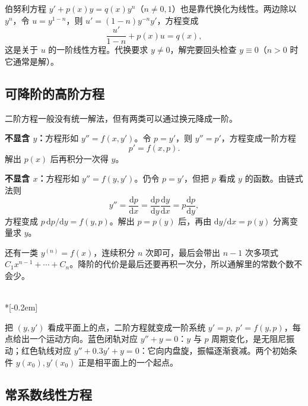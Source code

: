 伯努利方程 $y'+p(x)y=q(x)y^n$（$n\ne0,1$）也是靠代换化为线性。两边除以 $y^n$，令 $u=y^{1-n}$，则 $u'=(1-n)y^{-n}y'$，方程变成
\[
  \frac{u'}{1-n}+p(x)u=q(x),
\]
这是关于 $u$ 的一阶线性方程。代换要求 $y\ne0$，解完要回头检查 $y\equiv0$（$n>0$ 时它通常是解）。

\subsection{可降阶的高阶方程}

二阶方程一般没有统一解法，但有两类可以通过换元降成一阶。

\textbf{不显含 $y$：}方程形如 $y''=f(x,y')$。令 $p=y'$，则 $y''=p'$，方程变成一阶方程
\[
  p'=f(x,p).
\]
解出 $p(x)$ 后再积分一次得 $y$。

\textbf{不显含 $x$：}方程形如 $y''=f(y,y')$。仍令 $p=y'$，但把 $p$ 看成 $y$ 的函数。由链式法则
\[
  y''=\frac{\mathrm{d}p}{\mathrm{d}x}
      =\frac{\mathrm{d}p}{\mathrm{d}y}\frac{\mathrm{d}y}{\mathrm{d}x}
      =p\frac{\mathrm{d}p}{\mathrm{d}y},
\]
方程变成 $p\,\mathrm{d}p/\mathrm{d}y=f(y,p)$。解出 $p=p(y)$ 后，再由 $\mathrm{d}y/\mathrm{d}x=p(y)$ 分离变量求 $y$。

还有一类 $y^{(n)}=f(x)$，连续积分 $n$ 次即可，最后会带出 $n-1$ 次多项式 $C_1x^{n-1}+\cdots+C_n$。降阶的代价是最后还要再积一次分，所以通解里的常数个数不会少。

\begin{center}
\\*[-0.2em]
\parbox{0.86\linewidth}{\centering\footnotesize
把 $(y,y')$ 看成平面上的点，二阶方程就变成一阶系统 $y'=p,\ p'=f(y,p)$，每点给出一个运动方向。蓝色闭轨对应 $y''+y=0$：$y$ 与 $p$ 周期变化，是无阻尼振动；红色轨线对应 $y''+0.3y'+y=0$：它向内盘旋，振幅逐渐衰减。两个初始条件 $y(x_0),y'(x_0)$ 正是相平面上的一个起点。}
\end{center}

\subsection{常系数线性方程}

